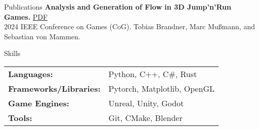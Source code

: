 \documentclass{resume} %
\begin{document}
\begin{rSection}{Publications}
{\bf Analysis and Generation of Flow in 3D Jump’n’Run Games.} \hfill {\href{https://ieeexplore.ieee.org/abstract/document/10645536}{PDF}}\\
\small 2024 IEEE Conference on Games (CoG). Tobias Brandner, Marc Mußmann, and Sebastian von Mammen.\\

\end{rSection}

\begin{rSection}{Skills}
    \begin{tabular}{>{\bfseries}l l} %
        \small Languages: & Python, C++, C\#, Rust \\
        \small Frameworks/Libraries: & Pytorch, Matplotlib, OpenGL \\
        \small Game Engines: & Unreal, Unity, Godot \\
        \small Tools: & Git, CMake, Blender \\
    \end{tabular}
\end{rSection}
\end{document}
